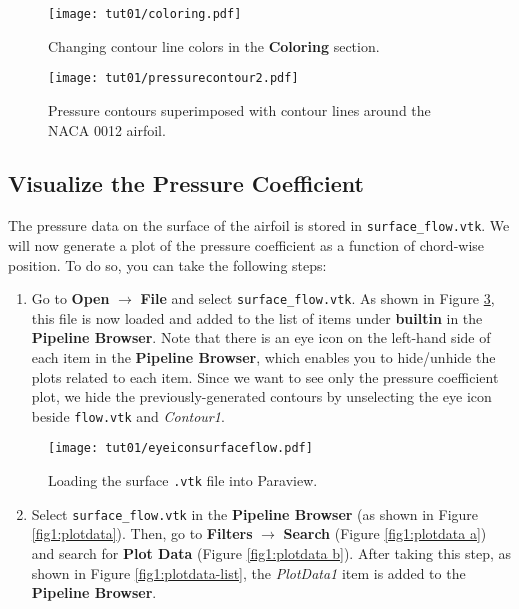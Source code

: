 \begin{figure}[!h]
    \centering
    \texttt{[image: tut01/coloring.pdf]}
    \caption{Changing contour line colors in the \textbf{Coloring} section.}
    \label{fig1:colorby2}
\end{figure}
\begin{figure}[!h]
    \centering
    \texttt{[image: tut01/pressurecontour2.pdf]}
    \caption{Pressure contours superimposed with contour lines around the NACA 0012 airfoil.}
    \label{fig1:pressure_contour_lines}
\end{figure}
\subsection{Visualize the Pressure Coefficient}
The pressure data on the surface of the airfoil is stored in \texttt{surface\_flow.vtk}. We will now generate a plot of the pressure coefficient as a function of chord-wise position. To do so, you can take the following steps:
\begin{enumerate}[label=\arabic*)]
	\setcounter{enumi}{0}
	\item Go to \textbf{Open} $\rightarrow$ \textbf{File} and select \texttt{surface\_flow.vtk}. As shown in Figure \ref{fig1:builtin}, this file is now loaded and added to the list of items under \textbf{builtin} in the \textbf{Pipeline Browser}. Note that there is an eye icon on the left-hand side of each item in the \textbf{Pipeline Browser}, which enables you to hide/unhide the plots related to each item. Since we want to see only the pressure coefficient plot, we hide the previously-generated contours by unselecting the eye icon beside \texttt{flow.vtk} and \textit{Contour1}.
\end{enumerate}
\begin{figure}[!h]
    \centering
    \texttt{[image: tut01/eyeiconsurfaceflow.pdf]}
    \caption{Loading the surface \texttt{.vtk} file into Paraview.}
    \label{fig1:builtin}
\end{figure}
\begin{enumerate}[label=\arabic*)]
	\setcounter{enumi}{1}
	\item Select \texttt{surface\_flow.vtk} in the \textbf{Pipeline Browser} (as shown in Figure \ref{fig1:plotdata}). Then, go to \textbf{Filters} $\rightarrow$ \textbf{Search} (Figure \ref{fig1:plotdata a}) and search for \textbf{Plot Data} (Figure \ref{fig1:plotdata b}). After taking this step, as shown in Figure \ref{fig1:plotdata-list}, the \textit{PlotData1} item is added to the \textbf{Pipeline Browser}.
\end{enumerate}
